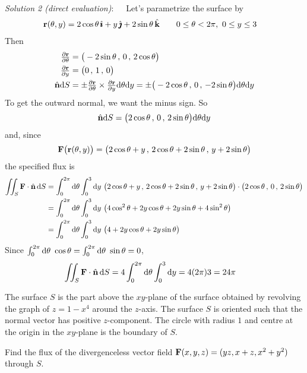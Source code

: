 \begin{solution}
\emph{Solution 2 (direct evaluation)}:\ \ \ 
Let's parametrize the surface by
\begin{align*}
\mathbf{r}(\theta,y) &= 2\cos\theta\,\hat{\pmb{\imath}} +y\,\hat{\pmb{\jmath}} + 2\sin\theta\,\hat{\mathbf{k}}\qquad
0\le\theta<2\pi,\ 0\le y\le 3
\end{align*}
Then
\begin{align*}
\tfrac{\partial\mathbf{r}}{\partial\theta}
&=\big(-2\sin\theta\,,\,
        0\,,\,
        2\cos\theta \big) \\
\tfrac{\partial\mathbf{r}}{\partial y}
&=\big(0\,,\,
       1\,,\,
       0\big) \\
\hat{\mathbf{n}}\mathrm{d}S
&=\pm\tfrac{\partial\mathbf{r}}{\partial\theta} \times \tfrac{\partial\mathbf{r}}{\partial y} 
   \mathrm{d}\theta\mathrm{d}y
=\pm \big(-2\cos\theta\,,\,
       0\,,\,
       -2\sin\theta\big)\mathrm{d}\theta\mathrm{d}y
\end{align*}
To get the outward normal, we want the minus sign. So
\begin{equation*}
\hat{\mathbf{n}}\mathrm{d}S
=\big(2\cos\theta\,,\,
       0\,,\,
       2\sin\theta\big)\mathrm{d}\theta\mathrm{d}y
\end{equation*}
and, since 
\begin{equation*}
\mathbf{F}\big(\mathbf{r}(\theta,y)\big)
=\big(2\cos\theta + y\,,\,2\cos\theta+2\sin\theta\,,\,y+2\sin\theta\big)
\end{equation*}
the specified flux is 
\begin{align*}
\dblInt_{S}\vF\cdot\hn\,\dee{S}
&= \int_0^{2\pi}\dee{\theta}\int_0^3\dee{y} \ 
\big(2\cos\theta + y\,,\,2\cos\theta+2\sin\theta\,,\,y+2\sin\theta\big)\cdot
  \big(2\cos\theta\,,\,0\,,\, 2\sin\theta\big) \\
&= \int_0^{2\pi}\dee{\theta}\int_0^3\dee{y} \ 
\big(4\cos^2\theta + 2y\cos\theta
      +2y\sin\theta+4\sin^2\theta\big)  \\
&= \int_0^{2\pi}\dee{\theta}\int_0^3\dee{y} \ 
\big(4 + 2y\cos\theta +2y\sin\theta\big)  
\end{align*}
Since $\int_0^{2\pi}\mathrm{d}\theta\ \cos\theta
 = \int_0^{2\pi}\mathrm{d}\theta\ \sin\theta = 0$,
\begin{align*}
\iint_{S}\mathbf{F}\cdot\hat{\mathbf{n}}\,\mathrm{d}S
&= 4\int_0^{2\pi}\mathrm{d}\theta\int_0^3\mathrm{d}y 
=4(2\pi)3
=24\pi 
\end{align*}
\end{solution}

\begin{question}[M317 2008D] %
The surface $S$ is the part above the $xy$-plane of the surface obtained 
by revolving the graph of $z = 1 - x^4$ around the $z$-axis. 
The surface $S$ is oriented such that the normal vector has positive 
$z$-component. The circle with radius $1$ and centre at the origin 
in the $xy$-plane is the boundary of $S$.

Find the flux of the divergenceless vector field 
$\mathbf{F}(x, y, z) = (yz, x + z, x^2 + y^2)$ through $S$.
\end{question}

